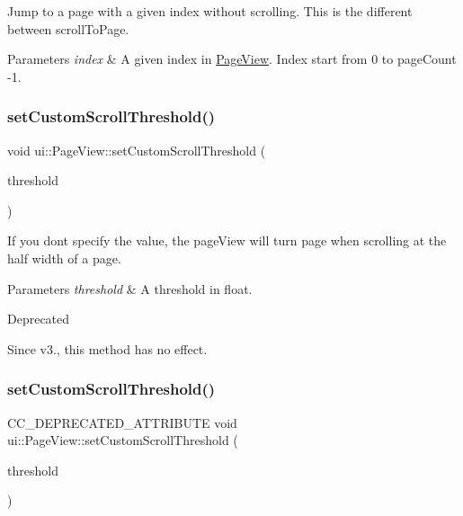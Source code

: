 Jump to a page with a given index without scrolling. This is the different between scroll\+To\+Page.


\begin{DoxyParams}{Parameters}
{\em index} & A given index in \hyperlink{classui_1_1PageView}{Page\+View}. Index start from 0 to page\+Count -\/1. \\
\hline
\end{DoxyParams}
\mbox{\label{classui_1_1PageView_a10f9b43ef5ebff540e6546ed810d1be4}} 
\subsubsection{\texorpdfstring{set\+Custom\+Scroll\+Threshold()}{setCustomScrollThreshold()}\hspace{0.1cm}{\footnotesize\ttfamily [1/2]}}
{\footnotesize\ttfamily void ui\+::\+Page\+View\+::set\+Custom\+Scroll\+Threshold (\begin{DoxyParamCaption}\item[{float}]{threshold }\end{DoxyParamCaption})}



If you don\textquotesingle{}t specify the value, the page\+View will turn page when scrolling at the half width of a page. 


\begin{DoxyParams}{Parameters}
{\em threshold} & A threshold in float. \\
\hline
\end{DoxyParams}
\begin{DoxyRefDesc}{Deprecated}
\item[\hyperlink{deprecated__deprecated000151}{Deprecated}]Since v3., this method has no effect. \end{DoxyRefDesc}
\mbox{\label{classui_1_1PageView_a4822a9ebfefc69a6d02a0bb13551523f}} 
\subsubsection{\texorpdfstring{set\+Custom\+Scroll\+Threshold()}{setCustomScrollThreshold()}\hspace{0.1cm}{\footnotesize\ttfamily [2/2]}}
{\footnotesize\ttfamily C\+C\+\_\+\+D\+E\+P\+R\+E\+C\+A\+T\+E\+D\+\_\+\+A\+T\+T\+R\+I\+B\+U\+TE void ui\+::\+Page\+View\+::set\+Custom\+Scroll\+Threshold (\begin{DoxyParamCaption}\item[{float}]{threshold }\end{DoxyParamCaption})}



